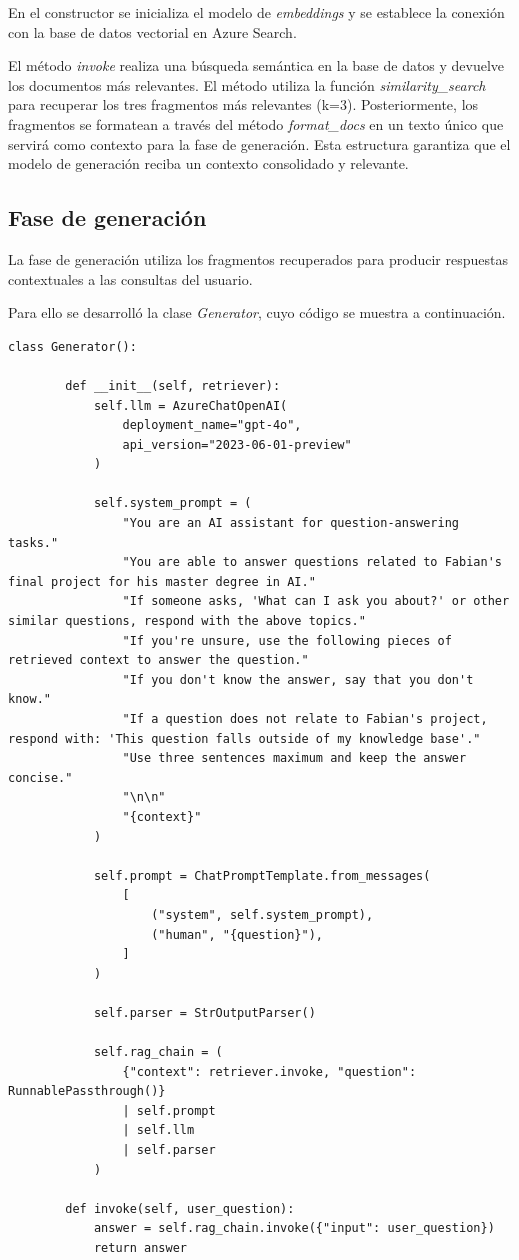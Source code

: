 En el constructor se inicializa el modelo de \textit{embeddings} y se establece la conexión con la base de datos vectorial en Azure Search.

El método \textit{invoke} realiza una búsqueda semántica en la base de datos y devuelve los documentos más relevantes. El método utiliza la 
función \textit{similarity\_search} para recuperar los tres fragmentos más relevantes (k=3). Posteriormente, los fragmentos se 
formatean a través del método \textit{format\_docs} en un texto único que servirá como contexto para la fase de generación. Esta 
estructura garantiza que el modelo de generación reciba un contexto consolidado y relevante.

\subsection{Fase de generación}

La fase de generación utiliza los fragmentos recuperados para producir respuestas contextuales a las consultas del usuario.

Para ello se desarrolló la clase \textit{Generator}, cuyo código se muestra a continuación.

\begin{lstlisting}[label=cod:generator,caption=Clase \textit{Generator}.]
	class Generator():

		def __init__(self, retriever):
			self.llm = AzureChatOpenAI(
				deployment_name="gpt-4o",
				api_version="2023-06-01-preview"
			)

			self.system_prompt = (
				"You are an AI assistant for question-answering tasks."
				"You are able to answer questions related to Fabian's final project for his master degree in AI."
				"If someone asks, 'What can I ask you about?' or other similar questions, respond with the above topics."
				"If you're unsure, use the following pieces of retrieved context to answer the question." 
				"If you don't know the answer, say that you don't know."
				"If a question does not relate to Fabian's project, respond with: 'This question falls outside of my knowledge base'." 
				"Use three sentences maximum and keep the answer concise."
				"\n\n"
				"{context}"
			)

			self.prompt = ChatPromptTemplate.from_messages(
				[
					("system", self.system_prompt),
					("human", "{question}"),
				]
			)

			self.parser = StrOutputParser()

			self.rag_chain = (
				{"context": retriever.invoke, "question": RunnablePassthrough()}
				| self.prompt
				| self.llm
				| self.parser
			)

		def invoke(self, user_question):
			answer = self.rag_chain.invoke({"input": user_question})
			return answer
\end{lstlisting}

